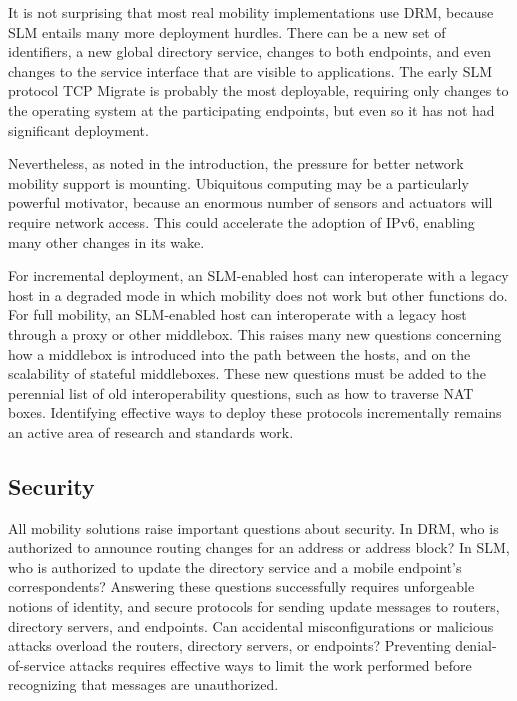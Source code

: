 It is not surprising that most real mobility implementations use DRM,
because SLM entails many more deployment hurdles.
There can be a new set of identifiers, a new global directory service,
changes to both endpoints, and even
changes to the service interface that are visible to applications.
The early SLM protocol TCP Migrate \cite{tcp-migrate} is probably
the most deployable, requiring only changes to the operating system
at the participating endpoints, but even so it has not had significant
deployment.

Nevertheless, as noted in the introduction,
the pressure for better network mobility support is mounting.
Ubiquitous computing may be a particularly powerful motivator,
because an enormous number of sensors and actuators will require
network access.
This could accelerate the adoption of IPv6, enabling many
other changes in its wake.

For incremental deployment, an SLM-enabled host can interoperate
with a legacy host in a degraded mode in which mobility does not work
but other functions do.
For full mobility, an SLM-enabled host can interoperate with
a legacy host through a proxy or other middlebox.
This raises many new questions concerning how a middlebox is
introduced into the path between the hosts, and on the scalability
of stateful middleboxes.
These new questions must be added to the perennial list of old
interoperability questions, such as how to traverse
NAT boxes.
Identifying
effective ways to deploy these protocols incrementally remains an
active area of research and standards work.

\subsection{Security}

All mobility solutions raise important questions about
security.  
In DRM, who is authorized to announce
routing changes for an address or address block?  
In SLM, who is authorized to update the directory service and a
mobile endpoint's correspondents?  
Answering these questions
successfully requires unforgeable notions of identity, and secure
protocols for sending update messages to routers, directory servers,
and endpoints.  
Can accidental misconfigurations or malicious attacks
overload the routers, directory servers, or endpoints?  Preventing
denial-of-service attacks requires effective ways to limit the work
performed before recognizing that messages are unauthorized.  

